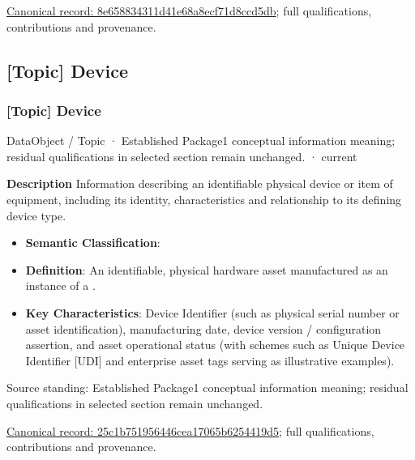 {\footnotesize \href{../../../../continuum/application/data-object/topic/8e658834311d41e68a8ecf71d8ccd5db.md}{Canonical record: 8e658834311d41e68a8ecf71d8ccd5db}; full qualifications, contributions and provenance.}\par
\subsection{[Topic] Device}

\subsubsection{[Topic] Device}

\label{element:25c1b751956446cea17065b6254419d5}
{\small DataObject / Topic · Established Package1 conceptual information meaning; residual qualifications in selected section remain unchanged. · current}\par

\textbf{Description}
Information describing an identifiable physical device or item of equipment, including its identity, characteristics and relationship to its defining device type.



\begin{itemize}


\item \textbf{Semantic Classification}: \texttt{}

\item \textbf{Definition}: An identifiable, physical hardware asset manufactured as an instance of a \texttt{}.

\item \textbf{Key Characteristics}: Device Identifier (such as physical serial number or asset identification), manufacturing date, device version / configuration assertion, and asset operational status (with schemes such as Unique Device Identifier [UDI] and enterprise asset tags serving as illustrative examples).

\end{itemize}


Source standing: Established Package1 conceptual information meaning; residual qualifications in selected section remain unchanged.


{\footnotesize \href{../../../../continuum/application/data-object/topic/25c1b751956446cea17065b6254419d5.md}{Canonical record: 25c1b751956446cea17065b6254419d5}; full qualifications, contributions and provenance.}\par

